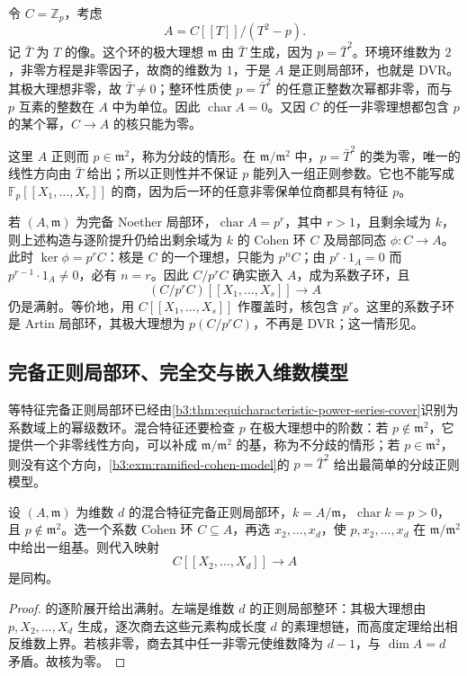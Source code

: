 \begin{example}\label{b3:exm:ramified-cohen-model}
	令 \(C=\mathbb Z_p\)，考虑
	\[
		A=C[\![T]\!]/(T^2-p).
	\]
	记 \(\bar T\) 为 \(T\) 的像。这个环的极大理想 \(\mathfrak m\) 由 \(\bar T\) 生成，因为 \(p=\bar T^2\)。环境环维数为 \(2\)，非零方程是非零因子，故商的维数为 \(1\)，于是 \(A\) 是正则局部环，也就是 DVR。其极大理想非零，故 \(\bar T\ne0\)；整环性质使 \(p=\bar T^2\) 的任意正整数次幂都非零，而与 \(p\) 互素的整数在 \(A\) 中为单位。因此 \(\operatorname{char}A=0\)。又因 \(C\) 的任一非零理想都包含 \(p\) 的某个幂，\(C\to A\) 的核只能为零。

	\ProseParagraphBreak
	这里 \(A\) 正则而 \(p\in\mathfrak m^2\)，称为分歧的情形。在 \(\mathfrak m/\mathfrak m^2\) 中，\(p=\bar T^2\) 的类为零，唯一的线性方向由 \(\bar T\) 给出；所以正则性并不保证 \(p\) 能列入一组正则参数。它也不能写成 \(\mathbb F_p[\![X_1,\ldots,X_r]\!]\) 的商，因为后一环的任意非零保单位商都具有特征 \(p\)。
\end{example}

若 \((A,\mathfrak m)\) 为完备 Noether 局部环，\(\operatorname{char}A=p^r\)，其中 \(r>1\)，且剩余域为 \(k\)，则上述构造与逐阶提升仍给出剩余域为 \(k\) 的 Cohen 环 \(C\) 及局部同态 \(\phi:C\to A\)。此时 \(\ker\phi=p^rC\)：核是 \(C\) 的一个理想，只能为 \(p^nC\)；由 \(p^r\cdot1_A=0\) 而 \(p^{r-1}\cdot1_A\ne0\)，必有 \(n=r\)。因此 \(C/p^rC\) 确实嵌入 \(A\)，成为系数子环，且
\[
	(C/p^rC)[\![X_1,\ldots,X_s]\!]\longrightarrow A
\]
仍是满射。等价地，用 \(C[\![X_1,\ldots,X_s]\!]\) 作覆盖时，核包含 \(p^r\)。这里的系数子环是 Artin 局部环，其极大理想为 \(p(C/p^rC)\)，不再是 DVR；这一情形见\cite[Theorem 29.3 and the preceding discussion, p. 225]{Matsumura1989CommutativeRingTheory}。

\subsection{完备正则局部环、完全交与嵌入维数模型}
\label{b3:subsec:D02:04}

等特征完备正则局部环已经由\cref{b3:thm:equicharacteristic-power-series-cover}识别为系数域上的幂级数环。混合特征还要检查 \(p\) 在极大理想中的阶数：若 \(p\notin\mathfrak m^2\)，它提供一个非零线性方向，可以补成 \(\mathfrak m/\mathfrak m^2\) 的基，称为不分歧的情形；若 \(p\in\mathfrak m^2\)，则没有这个方向，\cref{b3:exm:ramified-cohen-model}的 \(p=\bar T^2\) 给出最简单的分歧正则模型。

\begin{proposition}\label{b3:prop:unramified-regular-cohen-model}
	设 \((A,\mathfrak m)\) 为维数 \(d\) 的混合特征完备正则局部环，\(k=A/\mathfrak m\)，\(\operatorname{char}k=p>0\)，且 \(p\notin\mathfrak m^2\)。选一个系数 Cohen 环 \(C\subseteq A\)，再选 \(x_2,\ldots,x_d\)，使 \(p,x_2,\ldots,x_d\) 在 \(\mathfrak m/\mathfrak m^2\) 中给出一组基。则代入映射
	\[
		C[\![X_2,\ldots,X_d]\!]\longrightarrow A
	\]
	是同构。
\end{proposition}
\begin{proof}
	的逐阶展开给出满射。左端是维数 \(d\) 的正则局部整环：其极大理想由 \(p,X_2,\ldots,X_d\) 生成，逐次商去这些元素构成长度 \(d\) 的素理想链，而高度定理给出相反维数上界。若核非零，商去其中任一非零元使维数降为 \(d-1\)，与 \(\dim A=d\) 矛盾。故核为零。
\end{proof}

